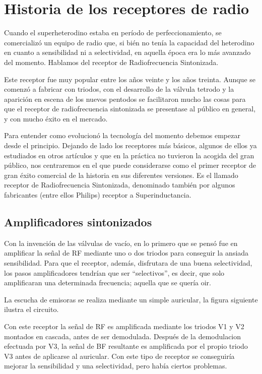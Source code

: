 \documentclass[letterpaper,10pt,spanish]{sphinxmanual}
\let\sphinxpxdimen\pdfpxdimen\else\newdimen\sphinxpxdimen
\begin{document}
\section{Historia de los receptores de radio}
\label{\detokenize{introduccion/sistemas:Historia-de-los-receptores-de-radio}}
Cuando el superheterodino estaba en período de perfeccionamiento, se comercializó un equipo de radio que, si bién no tenía la capacidad del heterodino en cuanto a sensibilidad ni a selectividad, en aquella época era lo más avanzado del momento. Hablamos del receptor de Radiofrecuencia Sintonizada.

Este receptor fue muy popular entre los años veinte y los años treinta. Aunque se comenzó a fabricar con triodos, con el desarrollo de la válvula tetrodo y la aparición en escena de los nuevos pentodos se facilitaron mucho las cosas para que el receptor de radiofrecuencia sintonizada se presentase al público en general, y con mucho éxito en el mercado.

Para entender como evolucionó la tecnología del momento debemos empezar desde el principio. Dejando de lado los receptores más básicos, algunos de ellos ya estudiados en otros artículos y que en la práctica no tuvieron la acogida del gran público, nos centraremos en el que puede considerarse como el primer receptor de gran éxito comercial de la historia en sus diferentes versiones. Es el llamado receptor de Radiofrecuencia Sintonizada, denominado también por algunos fabricantes (entre ellos
Philips) receptor a Superinductancia.


\subsection{Amplificadores sintonizados}
\label{\detokenize{introduccion/sistemas:Amplificadores-sintonizados}}
Con la invención de las válvulas de vacío, en lo primero que se pensó fue en amplificar la señal de RF mediante uno o dos triodos para conseguir la ansiada sensibilidad. Para que el receptor, además, disfrutara de una buena selectividad, los pasos amplificadores tendrían que ser “selectivos”, es decir, que solo amplificaran una determinada frecuencia; aquella que se quería oir.

La escucha de emisoras se realiza mediante un simple auricular, la figura siguiente ilustra el circuito.

\sphinxincludegraphics[width=588\sphinxpxdimen,height=210\sphinxpxdimen]{{receprfs1low}.png}

Con este receptor la señal de RF es amplificada mediante los triodos V1 y V2 montados en cascada, antes de ser demodulada. Después de la demodulacion efectuada por V3, la señal de BF resultante es amplificada por el propio triodo V3 antes de aplicarse al auricular. Con este tipo de receptor se conseguiría mejorar la sensibilidad y una selectividad, pero había ciertos problemas.
\end{document}

